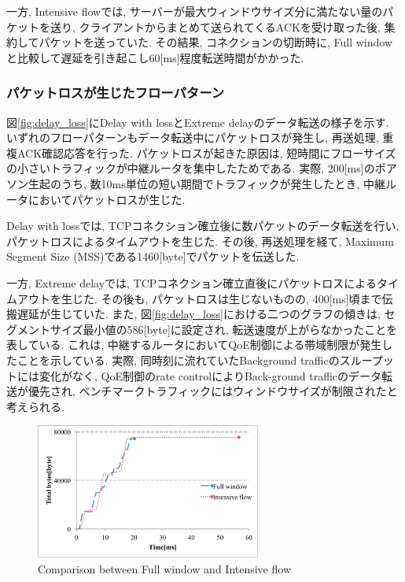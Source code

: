 \documentclass[10pt, a4paper, twocolumn]{jsarticle}
\begin{document}
一方, Intensive flowでは, サーバーが最大ウィンドウサイズ分に満たない量のパケットを送り,
クライアントからまとめて送られてくるACKを受け取った後, 集約してパケットを送っていた.
その結果, コネクションの切断時に, Full windowと比較して遅延を引き起こし60[ms]程度転送時間がかかった.

\subsubsection{パケットロスが生じたフローパターン}
図\ref{fig:delay_loss}にDelay with lossとExtreme delayのデータ転送の様子を示す.
いずれのフローパターンもデータ転送中にパケットロスが発生し, 再送処理, 重複ACK確認応答を行った.
パケットロスが起きた原因は, 短時間にフローサイズの小さいトラフィックが中継ルータを集中したためである.
実際, 200[ms]のポアソン生起のうち, 数10ms単位の短い期間でトラフィックが発生したとき, 中継ルータにおいてパケットロスが生じた.

Delay with lossでは, TCPコネクション確立後に数パケットのデータ転送を行い, パケットロスによるタイムアウトを生じた.
その後, 再送処理を経て, Maximum Segment Size (MSS)である1460[byte]でパケットを伝送した.

一方, Extreme delayでは, TCPコネクション確立直後にパケットロスによるタイムアウトを生じた.
その後も, パケットロスは生じないものの, 400[ms]頃まで伝搬遅延が生じていた.
また, 図\ref{fig:delay_loss}における二つのグラフの傾きは, セグメントサイズ最小値の586[byte]に設定され,
転送速度が上がらなかったことを表している.
これは, 中継するルータにおいてQoE制御による帯域制限が発生したことを示している.
実際, 同時刻に流れていたBackground trafficのスループットには変化がなく, QoE制御のrate controlによりBack-ground
trafficのデータ転送が優先され, ベンチマークトラフィックにはウィンドウサイズが制限されたと考えられる.

\begin{figure}[h]
    \begin{center}
    \includegraphics[autoebb, width=210pt]{./img/full_intensive.pdf}
    \caption{Comparison between Full window and Intensive flow}
    \label{fig:full_intensive}
    \end{center}
\end{figure}
\end{document}
